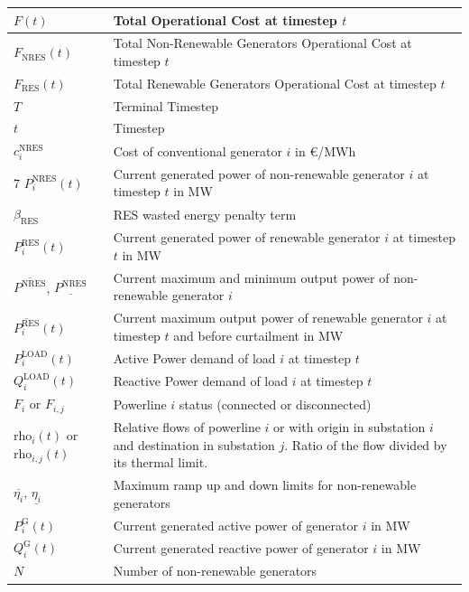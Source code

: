 \begin{center}
	\begin{tabular}{ | m{2cm} | m{10cm}| } 
		\hline
		$F(t)$ & Total Operational Cost at timestep $t$ \\ 
		\hline
		$F_\text{NRES}(t)$ & Total Non-Renewable Generators Operational Cost at timestep $t$ \\
		\hline
		$F_\text{RES}(t)$ & Total Renewable Generators Operational Cost at timestep $t$  \\
		\hline
		$T$ & Terminal Timestep \\
		\hline
		$t$ & Timestep \\
		\hline
		$c^\text{NRES}_i$ & Cost of conventional generator $i$ in €/MWh \\
		\hline7
		$P^\text{NRES}_i(t)$ & Current generated power of non-renewable generator $i$ at timestep $t$ in MW \\
		\hline
		$\beta_\text{RES}$ & \ac{RES} wasted energy penalty term \\
		\hline
		$P^\text{RES}_i(t)$ & Current generated power of renewable generator $i$ at timestep $t$ in MW \\
		\hline
		$\overline{P^\text{NRES}}$, $\underline{P^\text{NRES}}$ &  Current maximum and minimum output power of non-renewable generator $i$ \\
		$\overline{P^\text{RES}_i}(t)$ &  Current maximum output power of renewable generator $i$ at timestep $t$ and before curtailment in MW \\
		\hline
		$P^\text{LOAD}_i(t)$ & Active Power demand of load $i$ at timestep $t$ \\
		\hline
		$Q^\text{LOAD}_i(t)$ & Reactive Power demand of load $i$ at timestep $t$ \\
		\hline
		$F_i$ or $F_{i,j}$ & Powerline $i$ status (connected or disconnected)\\
		\hline
		$\text{rho}_i(t)$ or $\text{rho}_{i,j}(t)$ & Relative flows of powerline $i$ or with origin in substation $i$ and destination in substation $j$. Ratio of the flow divided by its thermal limit. \\
		\hline
		$\overline{\eta_i}$, $\underline{\eta_i}$ & Maximum ramp up and down limits for non-renewable generators \\
		$P^\text{G}_i(t)$ & Current generated active power of generator $i$ in MW \\
		\hline
		$Q^\text{G}_i(t)$ & Current generated reactive power of generator $i$ in MW \\
		\hline
		$N$ & Number of non-renewable generators \\

\end{tabular}
\end{center}
